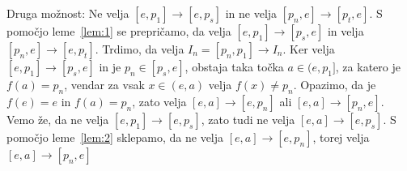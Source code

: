 \documentclass[../TG_magistrsko_delo_sections.tex]{subfiles}
\begin{document}
\begin{dokaz}
Druga možnost:
Ne velja $[e, p_1] \to [e, p_s]$ in ne velja $[p_n, e] \to [p_t, e]$. S pomočjo leme~\ref{lem:1} se prepričamo, da velja $[e, p_1] \to [p_s, e]$ in velja $[p_n, e] \to [e, p_t]$. Trdimo, da velja $I_n = [p_n, p_1] \to I_n$. Ker velja $[e, p_1] \to [p_s, e]$ in je $p_n \in [p_s, e]$, obstaja taka točka $a \in (e, p_1]$, za katero je $f(a) = p_n$, vendar za vsak $x \in (e, a)$ velja $f(x) \neq p_n$. Opazimo, da je $f(e) = e$ in $f(a) = p_n$, zato velja $[e, a] \to [e, p_n]$ ali $[e, a] \to [p_n, e]$. Vemo že, da ne velja $[e, p_1] \to [e, p_s]$, zato tudi ne velja $[e, a] \to [e, p_s]$. S pomočjo leme~\ref{lem:2} sklepamo, da ne velja $[e, a] \to [e, p_n]$, torej velja $[e, a] \to [p_n, e]$
\end{dokaz}
\end{document}
